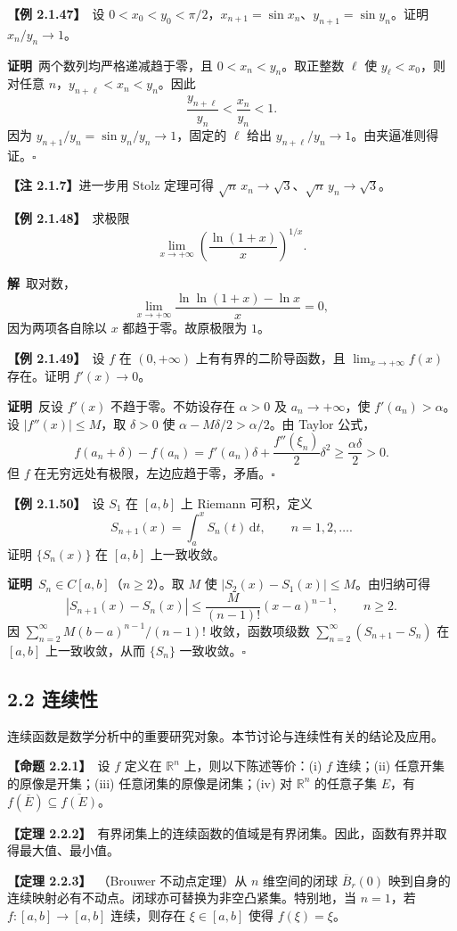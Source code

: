 \documentclass[UTF8,a4paper,11pt]{ctexart}
\newcommand{\ex}[1]{\par\medskip\noindent\textbf{【例 #1】}\ }
\newcommand{\prop}[1]{\par\medskip\noindent\textbf{【命题 #1】}\ }
\newcommand{\thm}[1]{\par\medskip\noindent\textbf{【定理 #1】}\ }
\newcommand{\pf}{\par\noindent\textbf{证明}\ }
\newcommand{\sol}{\par\noindent\textbf{解}\ }
\begin{document}
\ex{2.1.47}设 $0<x_0<y_0<\pi/2$，$x_{n+1}=\sin x_n$、$y_{n+1}=\sin y_n$。证明 $x_n/y_n\to1$。
\pf 两个数列均严格递减趋于零，且 $0<x_n<y_n$。取正整数 $\ell$ 使 $y_\ell<x_0$，则对任意 $n$，$y_{n+\ell}<x_n<y_n$。因此
\[
\frac{y_{n+\ell}}{y_n}<\frac{x_n}{y_n}<1.
\]
因为 $y_{n+1}/y_n=\sin y_n/y_n\to1$，固定的 $\ell$ 给出 $y_{n+\ell}/y_n\to1$。由夹逼准则得证。\hfill$\square$

\noindent\textbf{【注 2.1.7】}进一步用 Stolz 定理可得 $\sqrt n\,x_n\to\sqrt3$、$\sqrt n\,y_n\to\sqrt3$。

\ex{2.1.48}求极限
\[
\lim_{x\to+\infty}\left(\frac{\ln(1+x)}x\right)^{1/x}.
\]
\sol 取对数，
\[
\lim_{x\to+\infty}\frac{\ln\ln(1+x)-\ln x}{x}=0,
\]
因为两项各自除以 $x$ 都趋于零。故原极限为 $1$。

\ex{2.1.49}设 $f$ 在 $(0,+\infty)$ 上有有界的二阶导函数，且 $\lim_{x\to+\infty}f(x)$ 存在。证明 $f'(x)\to0$。
\pf 反设 $f'(x)$ 不趋于零。不妨设存在 $\alpha>0$ 及 $a_n\to+\infty$，使 $f'(a_n)>\alpha$。设 $|f''(x)|\le M$，取 $\delta>0$ 使 $\alpha-M\delta/2>\alpha/2$。由 Taylor 公式，
\[
f(a_n+\delta)-f(a_n)
=f'(a_n)\delta+\frac{f''(\xi_n)}2\delta^2
\ge\frac{\alpha\delta}{2}>0.
\]
但 $f$ 在无穷远处有极限，左边应趋于零，矛盾。\hfill$\square$

\ex{2.1.50}设 $S_1$ 在 $[a,b]$ 上 Riemann 可积，定义
\[
S_{n+1}(x)=\int_a^x S_n(t)\,\mathrm dt,\qquad n=1,2,\ldots.
\]
证明 $\{S_n(x)\}$ 在 $[a,b]$ 上一致收敛。
\pf $S_n\in C[a,b]$（$n\ge2$）。取 $M$ 使 $|S_2(x)-S_1(x)|\le M$。由归纳可得
\[
|S_{n+1}(x)-S_n(x)|\le\frac{M}{(n-1)!}(x-a)^{n-1},\qquad n\ge2.
\]
因 $\sum_{n=2}^{\infty}M(b-a)^{n-1}/(n-1)!$ 收敛，函数项级数 $\sum_{n=2}^{\infty}(S_{n+1}-S_n)$ 在 $[a,b]$ 上一致收敛，从而 $\{S_n\}$ 一致收敛。\hfill$\square$
\clearpage
\subsection*{2.2 连续性}
连续函数是数学分析中的重要研究对象。本节讨论与连续性有关的结论及应用。

\prop{2.2.1}设 $f$ 定义在 $\mathbb R^n$ 上，则以下陈述等价：(i) $f$ 连续；(ii) 任意开集的原像是开集；(iii) 任意闭集的原像是闭集；(iv) 对 $\mathbb R^n$ 的任意子集 $E$，有 $f(\overline E)\subseteq\overline{f(E)}$。

\thm{2.2.2}有界闭集上的连续函数的值域是有界闭集。因此，函数有界并取得最大值、最小值。

\thm{2.2.3}（Brouwer 不动点定理）从 $n$ 维空间的闭球 $\overline B_r(0)$ 映到自身的连续映射必有不动点。闭球亦可替换为非空凸紧集。特别地，当 $n=1$，若 $f:[a,b]\to[a,b]$ 连续，则存在 $\xi\in[a,b]$ 使得 $f(\xi)=\xi$。
\end{document}
